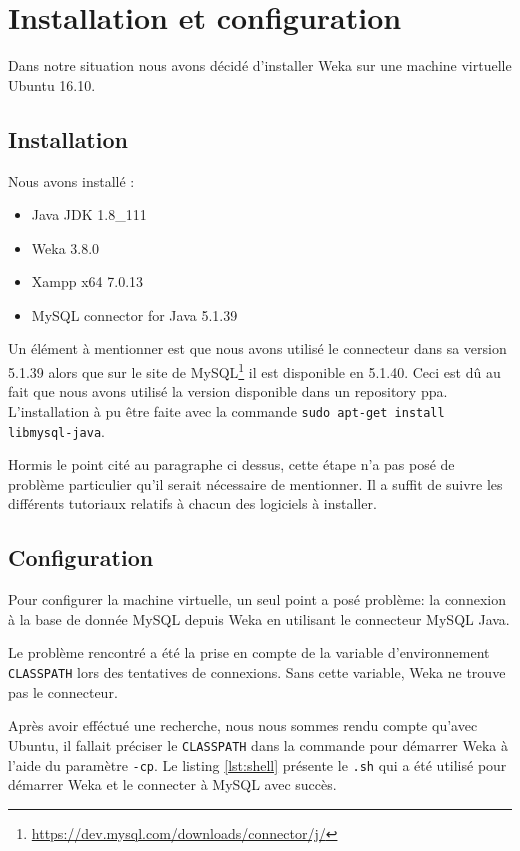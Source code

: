 \chapter{Installation et configuration}

Dans notre situation nous avons décidé d'installer Weka sur une machine virtuelle Ubuntu 16.10.

\section{Installation}

Nous avons installé :

\begin{itemize}
	\item Java JDK 1.8\_111
	\item Weka 3.8.0
	\item Xampp x64 7.0.13
	\item MySQL connector for Java 5.1.39
\end{itemize}

Un élément à mentionner est que nous avons utilisé le connecteur dans sa version 5.1.39 alors que sur le site de MySQL\footnote{\url{https://dev.mysql.com/downloads/connector/j/}} il est disponible en 5.1.40. Ceci est dû au fait que nous avons utilisé la version disponible dans un repository ppa. L'installation à pu être faite avec la commande \texttt{sudo apt-get install libmysql-java}.

Hormis le point cité au paragraphe ci dessus, cette étape n'a pas posé de problème particulier qu'il serait nécessaire de mentionner. Il a suffit de suivre les différents tutoriaux relatifs à chacun des logiciels à installer.

\section{Configuration}

Pour configurer la machine virtuelle, un seul point a posé problème: la connexion à la base de donnée MySQL depuis Weka en utilisant le connecteur MySQL Java.

Le problème rencontré a été la prise en compte de la variable d'environnement \texttt{CLASSPATH} lors des tentatives de connexions. Sans cette variable, Weka ne trouve pas le connecteur.

Après avoir efféctué une recherche, nous nous sommes rendu compte qu'avec Ubuntu, il fallait préciser le \texttt{CLASSPATH} dans la commande pour démarrer Weka à l'aide du paramètre \texttt{-cp}. Le listing \autoref{lst:shell} présente le \texttt{.sh} qui a été utilisé pour démarrer Weka et le connecter à MySQL avec succès.

